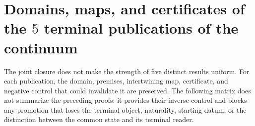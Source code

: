 \chapter{Domains, maps, and certificates of the \(5\) terminal publications of the continuum}
\label{chap:hmt83-falsadores-clausuras}

The joint closure does not make the strength of five distinct results uniform. For
each publication, the domain, premises, intertwining map,
certificate, and negative control that could invalidate it are preserved.
The following matrix does not summarize the preceding proofs: it provides their inverse control
and blocks any promotion that loses the terminal object, naturality, starting datum,
or the distinction between the common state and its terminal reader.


